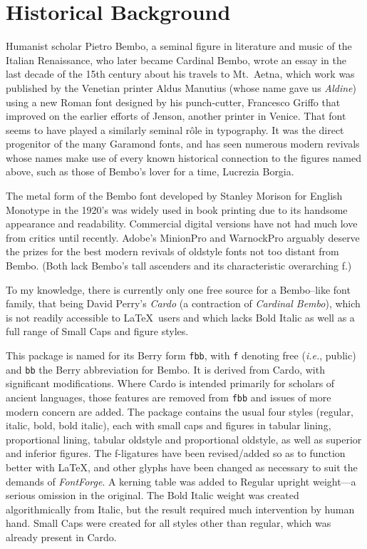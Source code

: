 \documentclass{article}
\begin{document}
\section{Historical Background}
Humanist scholar Pietro Bembo, a seminal figure in literature and music of the Italian Renaissance, who later became Cardinal Bembo, wrote an essay in the last decade of the 15th century about his travels to Mt.\ Aetna, which work was published by the Venetian printer Aldus Manutius (whose name gave us \emph{Aldine}) using a new Roman font designed by his punch-cutter, Francesco Griffo that improved on the earlier efforts of Jenson, another printer in Venice. That font seems to have played a similarly seminal r\^ole in  typography. It was the direct progenitor of the many Garamond fonts, and has seen numerous modern revivals whose names make use of every known historical connection to the figures named above, such as those of Bembo's  lover for a time, Lucrezia Borgia.

The metal form of the Bembo font developed by Stanley Morison for English Monotype in the 1920's was widely used in book printing due to its handsome appearance and readability. Commercial digital versions have not had much love from critics until recently.  Adobe's MinionPro and WarnockPro arguably deserve the prizes for the best modern revivals of oldstyle fonts not too distant from Bembo. (Both lack Bembo's tall ascenders and its characteristic overarching f.)

To my knowledge, there is currently only one free source for a Bembo--like font family, that being David Perry's \emph{Cardo} (a contraction of \emph{Cardinal Bembo}), which is not readily accessible to 
\LaTeX\ users and which lacks Bold Italic as well as a full range of Small Caps and figure styles.

This package is named for its Berry form {\tt fbb}, with {\tt f} denoting free (\emph{i.e.}, public) and {\tt bb} the Berry abbreviation for Bembo. It is derived from Cardo, with significant  modifications. Where Cardo is intended primarily  for scholars of ancient languages, those features are removed from {\tt fbb} and issues of more modern concern are added. The package contains the usual four styles (regular, italic, bold, bold italic), each with small caps and figures in tabular lining, proportional lining, tabular oldstyle and proportional oldstyle, as well as superior and inferior figures. The f-ligatures have been  revised/added  so as to function better with \LaTeX, and other glyphs have been changed as necessary to suit the demands of \emph{FontForge}. A kerning table was added to Regular upright weight---a serious omission in the original.  The Bold Italic weight was created algorithmically from Italic, but the result required much intervention by human hand. Small Caps were created for all styles other than regular, which was already present in Cardo. 
\end{document}
